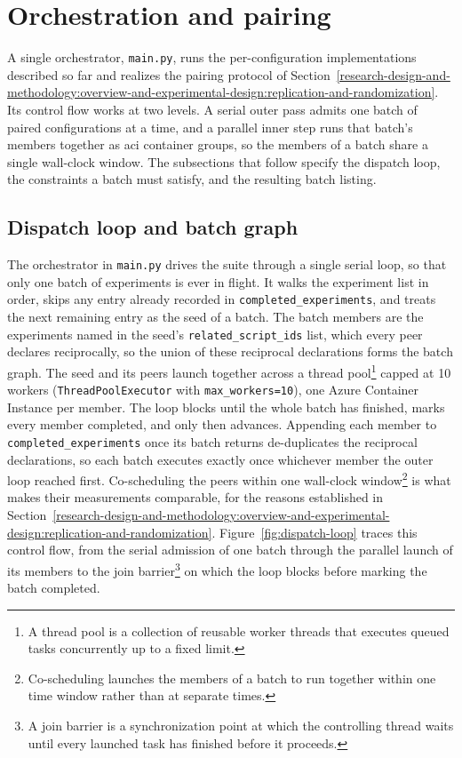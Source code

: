 \section{Orchestration and pairing}
\label{system-architecture-and-implementation:orchestration-and-pairing}

A single orchestrator, \texttt{main.py}, runs the per-configuration implementations described so far and realizes the pairing protocol of Section~\ref{research-design-and-methodology:overview-and-experimental-design:replication-and-randomization}. Its control flow works at two levels. A serial outer pass admits one batch of paired configurations at a time, and a parallel inner step runs that batch's members together as \acrshort{aci} container groups, so the members of a batch share a single wall-clock window. The subsections that follow specify the dispatch loop, the constraints a batch must satisfy, and the resulting batch listing.

\subsection{Dispatch loop and batch graph}
\label{system-architecture-and-implementation:orchestration-and-pairing:dispatch-loop-and-batch-graph}

The orchestrator in \texttt{main.py} drives the suite through a single serial loop, so that only one batch of experiments is ever in flight. It walks the experiment list in order, skips any entry already recorded in \texttt{completed\_experiments}, and treats the next remaining entry as the seed of a batch. The batch members are the experiments named in the seed's \texttt{related\_script\_ids} list, which every peer declares reciprocally, so the union of these reciprocal declarations forms the batch graph. The seed and its peers launch together across a thread pool\footnote{A thread pool is a collection of reusable worker threads that executes queued tasks concurrently up to a fixed limit.} capped at \num{10} workers (\texttt{ThreadPoolExecutor} with \texttt{max\_workers=10}), one Azure Container Instance per member. The loop blocks until the whole batch has finished, marks every member completed, and only then advances. Appending each member to \texttt{completed\_experiments} once its batch returns de-duplicates the reciprocal declarations, so each batch executes exactly once whichever member the outer loop reached first. Co-scheduling the peers within one wall-clock window\footnote{Co-scheduling launches the members of a batch to run together within one time window rather than at separate times.} is what makes their measurements comparable, for the reasons established in Section~\ref{research-design-and-methodology:overview-and-experimental-design:replication-and-randomization}. Figure~\ref{fig:dispatch-loop} traces this control flow, from the serial admission of one batch through the parallel launch of its members to the join barrier\footnote{A join barrier is a synchronization point at which the controlling thread waits until every launched task has finished before it proceeds.} on which the loop blocks before marking the batch completed.

